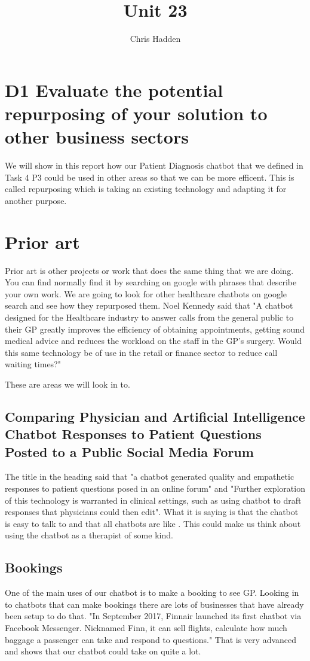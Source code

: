 \documentclass{article}
\title{Unit 23}
\author{Chris Hadden}
\date{}
\begin{document}
\maketitle
\section{D1 Evaluate the potential repurposing of your solution to other business sectors}
We will show in this report how our Patient Diagnosis chatbot that we defined in Task 4 P3 could be used in other areas so that we can be more efficent. This is called repurposing which is taking an existing technology and adapting it for another purpose.
\smallbreak

\section{Prior art}
Prior art is other projects or work that does the same thing that we are doing. You can find normally find it by searching on google with phrases that describe your own work. We are going to look for other healthcare chatbots on google search and see how they repurposed them.
\smallbreak
Noel Kennedy said that "A chatbot designed for the Healthcare industry to answer calls from the general public to their GP greatly improves the efficiency of obtaining appointments, getting sound medical advice and reduces the workload on the staff in the GP's surgery. Would this same technology be of use in the retail or finance sector to reduce call waiting times?" \cite{Noel}

These are areas we will look in to.
\smallbreak

\subsection{Comparing Physician and Artificial Intelligence Chatbot Responses to Patient Questions Posted to a Public Social Media Forum}
The title in the heading\cite{bedside} said that "a chatbot generated quality and empathetic responses to patient questions posed in an online forum" and "Further exploration of this technology is warranted in clinical settings, such as using chatbot to draft responses that physicians could then edit". What it is saying is that the chatbot is easy to talk to and that all chatbots are like . This could make us think about using the chatbot as a therapist of some kind.


\subsection{Bookings}\label{booking}
One of the main uses of our chatbot is to make a booking to see GP. Looking in to chatbots that can make bookings there are lots of businesses that have already been setup to do that.\cite{futr}\cite{booking}\cite{velma} "In September 2017, Finnair launched its first chatbot via Facebook Messenger. Nicknamed Finn, it can sell flights, calculate how much baggage a passenger can take and respond to questions."\cite{booking} That is very advanced and shows that our chatbot could take on quite a lot.
\end{document}
